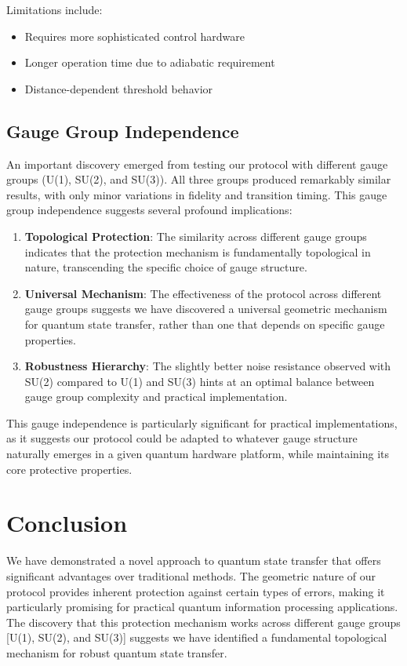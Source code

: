 \documentclass[12pt]{article}
\begin{document}
Limitations include:
\begin{itemize}
\item Requires more sophisticated control hardware
\item Longer operation time due to adiabatic requirement
\item Distance-dependent threshold behavior
\end{itemize}

\subsection{Gauge Group Independence}
An important discovery emerged from testing our protocol with different gauge groups (U(1), SU(2), and SU(3)). All three groups produced remarkably similar results, with only minor variations in fidelity and transition timing. This gauge group independence suggests several profound implications:

\begin{enumerate}
\item \textbf{Topological Protection}: The similarity across different gauge groups indicates that the protection mechanism is fundamentally topological in nature, transcending the specific choice of gauge structure.

\item \textbf{Universal Mechanism}: The effectiveness of the protocol across different gauge groups suggests we have discovered a universal geometric mechanism for quantum state transfer, rather than one that depends on specific gauge properties.

\item \textbf{Robustness Hierarchy}: The slightly better noise resistance observed with SU(2) compared to U(1) and SU(3) hints at an optimal balance between gauge group complexity and practical implementation.
\end{enumerate}

This gauge independence is particularly significant for practical implementations, as it suggests our protocol could be adapted to whatever gauge structure naturally emerges in a given quantum hardware platform, while maintaining its core protective properties.

\section{Conclusion}
We have demonstrated a novel approach to quantum state transfer that offers significant advantages over traditional methods. The geometric nature of our protocol provides inherent protection against certain types of errors, making it particularly promising for practical quantum information processing applications. The discovery that this protection mechanism works across different gauge groups [U(1), SU(2), and SU(3)] suggests we have identified a fundamental topological mechanism for robust quantum state transfer.
\end{document}
